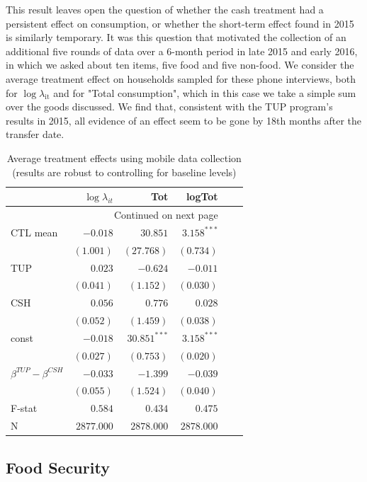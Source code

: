 \documentclass[12pt,article]{article}
\begin{document}
This result leaves open the question of whether the cash treatment had a persistent effect
on consumption, or whether the short-term effect found in 2015 is similarly
temporary. It was this question that motivated the collection of an additional five
rounds of data over a 6-month period in late 2015 and early 2016, in which
we asked about ten items, five food and five non-food. We consider the average treatment effect
on households sampled for these phone interviews, both for $\log$$\lambda$$_{\text{it}}$ and for
"Total consumption", which in this case we take a simple sum over the goods
discussed. We find that, consistent with the TUP program's results in 2015, all evidence of an effect
seem to be gone by 18th months after the transfer date.

\begin{longtable}{lrrrrr}
\caption{\label{tab:mobile_consumption}Average treatment effects using mobile data collection (results are robust to controlling for baseline levels)}
\\
\hline
 & $\log\lambda_{it}$ & Tot & logTot\\
\hline
\endhead
\hline\multicolumn{4}{r}{Continued on next page} \\
\endfoot
\endlastfoot
CTL mean & $-0.018$ & $30.851$ & $3.158^{***}$\\
 & $(1.001)$ & $(27.768)$ & $(0.734)$\\
\hline
TUP & $0.023$ & $-0.624$ & $-0.011$\\
 & $(0.041)$ & $(1.152)$ & $(0.030)$\\
CSH & $0.056$ & $0.776$ & $0.028$\\
 & $(0.052)$ & $(1.459)$ & $(0.038)$\\
const & $-0.018$ & $30.851^{***}$ & $3.158^{***}$\\
 & $(0.027)$ & $(0.753)$ & $(0.020)$\\
\hline
$\beta^{TUP}-\beta^{CSH}$ & $-0.033$ & $-1.399$ & $-0.039$\\
 & $(0.055)$ & $(1.524)$ & $(0.040)$\\
\hline
F-stat & $0.584$ & $0.434$ & $0.475$\\
N & $2877.000$ & $2878.000$ & $2878.000$\\
\hline
\end{longtable}


\subsection{Food Security}
\label{sec-3-3}
\end{document}
